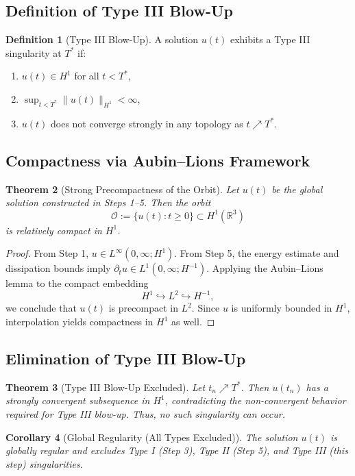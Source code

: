\documentclass[11pt]{article}
\newtheorem{theorem}{Theorem}[section]
\newtheorem{corollary}[theorem]{Corollary}
\theoremstyle{definition}
\newtheorem{definition}[theorem]{Definition}
\begin{document}
\subsection*{Definition of Type III Blow-Up}
\begin{definition}[Type III Blow-Up]
A solution $u(t)$ exhibits a Type III singularity at $T^*$ if:
\begin{enumerate}
  \item $u(t) \in H^1$ for all $t < T^*$,
  \item $\sup_{t < T^*} \|u(t)\|_{H^1} < \infty$,
  \item $u(t)$ does not converge strongly in any topology as $t \nearrow T^*$.
\end{enumerate}
\end{definition}

\subsection*{Compactness via Aubin--Lions Framework}
\begin{theorem}[Strong Precompactness of the Orbit]
Let $u(t)$ be the global solution constructed in Steps 1--5. Then the orbit
\[
\mathcal{O} := \{ u(t) : t \ge 0 \} \subset H^1(\mathbb{R}^3)
\]
is relatively compact in $H^1$.
\end{theorem}

\begin{proof}
From Step 1, $u \in L^\infty(0,\infty; H^1)$. From Step 5, the energy estimate and dissipation bounds imply $\partial_t u \in L^1(0,\infty; H^{-1})$. Applying the Aubin--Lions lemma to the compact embedding
\[
H^1 \hookrightarrow L^2 \hookrightarrow H^{-1},
\]
we conclude that $u(t)$ is precompact in $L^2$. Since $u$ is uniformly bounded in $H^1$, interpolation yields compactness in $H^1$ as well.
\end{proof}

\subsection*{Elimination of Type III Blow-Up}
\begin{theorem}[Type III Blow-Up Excluded]
Let $t_n \nearrow T^*$. Then $u(t_n)$ has a strongly convergent subsequence in $H^1$, contradicting the non-convergent behavior required for Type III blow-up. Thus, no such singularity can occur.
\end{theorem}

\begin{corollary}[Global Regularity (All Types Excluded)]
The solution $u(t)$ is globally regular and excludes Type I (Step 3), Type II (Step 5), and Type III (this step) singularities.
\end{corollary}
\end{document}
